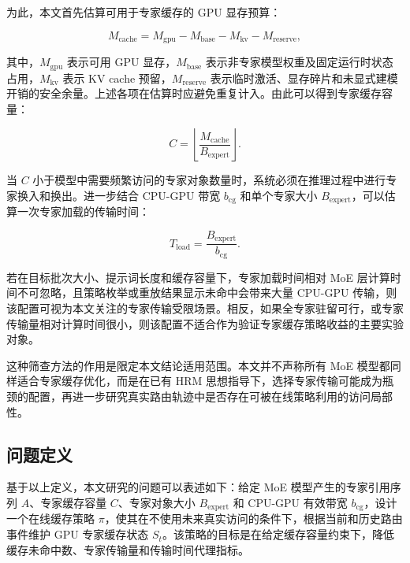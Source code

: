 为此，本文首先估算可用于专家缓存的 GPU 显存预算：

\begin{equation}
    \label{equ:expert-cache-memory}
    M_{\mathrm{cache}}=M_{\mathrm{gpu}}-M_{\mathrm{base}}-M_{\mathrm{kv}}-M_{\mathrm{reserve}},
\end{equation}

其中，$M_{\mathrm{gpu}}$ 表示可用 GPU 显存，$M_{\mathrm{base}}$ 表示非专家模型权重及固定运行时状态占用，$M_{\mathrm{kv}}$ 表示 KV cache 预留，$M_{\mathrm{reserve}}$ 表示临时激活、显存碎片和未显式建模开销的安全余量。上述各项在估算时应避免重复计入。由此可以得到专家缓存容量：

\begin{equation}
    \label{equ:expert-cache-capacity}
    C=\left\lfloor\frac{M_{\mathrm{cache}}}{B_{\mathrm{expert}}}\right\rfloor.
\end{equation}

当 $C$ 小于模型中需要频繁访问的专家对象数量时，系统必须在推理过程中进行专家换入和换出。进一步结合 CPU-GPU 带宽 $b_{\mathrm{cg}}$ 和单个专家大小 $B_{\mathrm{expert}}$，可以估算一次专家加载的传输时间：

\begin{equation}
    \label{equ:expert-load-time}
    T_{\mathrm{load}}=\frac{B_{\mathrm{expert}}}{b_{\mathrm{cg}}}.
\end{equation}

若在目标批次大小、提示词长度和缓存容量下，专家加载时间相对 MoE 层计算时间不可忽略，且策略枚举或重放结果显示未命中会带来大量 CPU-GPU 传输，则该配置可视为本文关注的专家传输受限场景。相反，如果全专家驻留可行，或专家传输量相对计算时间很小，则该配置不适合作为验证专家缓存策略收益的主要实验对象。

这种筛查方法的作用是限定本文结论适用范围。本文并不声称所有 MoE 模型都同样适合专家缓存优化，而是在已有 HRM 思想指导下，选择专家传输可能成为瓶颈的配置，再进一步研究真实路由轨迹中是否存在可被在线策略利用的访问局部性。

\subsection{问题定义}

基于以上定义，本文研究的问题可以表述如下：给定 MoE 模型产生的专家引用序列 $A$、专家缓存容量 $C$、专家对象大小 $B_{\mathrm{expert}}$ 和 CPU-GPU 有效带宽 $b_{\mathrm{cg}}$，设计一个在线缓存策略 $\pi$，使其在不使用未来真实访问的条件下，根据当前和历史路由事件维护 GPU 专家缓存状态 $S_t$。该策略的目标是在给定缓存容量约束下，降低缓存未命中数、专家传输量和传输时间代理指标。

